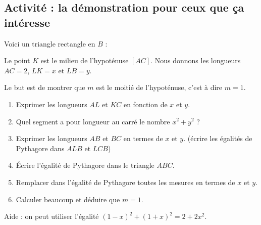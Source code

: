 
\subsection*{Activité : la démonstration pour ceux que ça intéresse}

Voici un triangle rectangle en \( B\) :

\begin{center}

\end{center}
Le point \( K\) est le milieu de l'hypoténuse \( [AC]\). Nous donnons les longueurs \( AC=2\), \( LK=x\) et \( LB=y\).

Le but est de montrer que \( m\) est le moitié de l'hypoténuse, c'est à dire \( m=1\).

\begin{enumerate}
    \item
        Exprimer les longueurs \( AL\) et \( KC\) en fonction de \( x\) et \( y\).
    \item
        Quel segment a pour longueur au carré le nombre \( x^2+y^2\) ?
    \item
        Exprimer les longueurs \( AB\) et \( BC\) en termes de \( x\) et \( y\). (écrire les égalités de Pythagore dans \( ALB\) et \( LCB\))
    \item
        Écrire l'égalité de Pythagore dans le triangle \( ABC\).
    \item
        Remplacer dans l'égalité de Pythagore toutes les mesures en termes de \( x\) et \( y\).
    \item
        Calculer beaucoup et déduire que \( m=1\).
\end{enumerate}
Aide : on peut utiliser l'égalité \( (1-x)^2+(1+x)^2=2+2x^2\).
